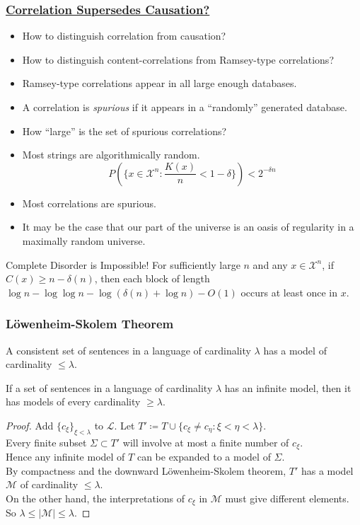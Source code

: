 \documentclass[UTF8,11pt,colorlinks,compress,openany]{beamer}%
\begin{document}
\begin{frame}\frametitle{\href{https://www.cs.auckland.ac.nz/~cristian/crispapers/fos2016.pdf}{Correlation Supersedes Causation?}}\vspace{-1ex}
	\begin{itemize}
		\item How to distinguish correlation from causation?
		\item How to distinguish content-correlations from Ramsey-type correlations?
		\item Ramsey-type correlations appear in all
		large enough databases.
		\item A correlation is \emph{spurious} if it appears in a ``randomly'' generated database.
		\item How ``large'' is the set of spurious correlations?
		\item Most strings are algorithmically random. 
		\[P\left(\Big\{x\in\mathcal{X}^n: \frac{K(x)}{n}<1-\delta\Big\}\right)<2^{-\delta n}\]
		\item Most correlations are spurious.
		\item It may be the case that our part of the universe is an oasis of regularity in a maximally random universe.
	\end{itemize}\vspace{-1ex}
	\begin{block}{Complete Disorder is Impossible!}
		For sufficiently large $n$ and any $x\in\mathcal{X}^n$, if $C(x)\geq n-\delta(n)$, then each block of length $\log n-\log\log n-\log(\delta(n)+\log n)-O(1)$ occurs at least once in $x$.
	\end{block}
\end{frame}

\begin{frame}\frametitle{L\"owenheim-Skolem Theorem}
\begin{theorem}
	A consistent set of sentences in a language of cardinality $\lambda$ has a model of cardinality $\leq\lambda$.
\end{theorem}
\begin{theorem}
	If a set of sentences in a language of cardinality $\lambda$ has an infinite model, then it has models of every cardinality $\geq\lambda$.
\end{theorem}
\begin{proof}
	Add $\{c_\xi\}_{\xi<\lambda}$ to $\mathscr{L}$. Let $T'\coloneqq T\cup\{c_\xi\ne c_\eta:\xi <\eta<\lambda\}$.\\
	Every finite subset $\Sigma\subset T'$ will involve at most a finite number of $c_\xi$.\\
	Hence any infinite model of $T$ can be expanded to a model of $\Sigma$.\\
	By compactness and the downward L\"owenheim-Skolem theorem, $T'$ has a model $\mathcal{M}$ of cardinality $\leq\lambda$.\\
	On the other hand, the interpretations of $c_\xi$ in $\mathcal{M}$ must give different elements. So $\lambda\leq |\mathcal{M}|\leq\lambda$.
\end{proof}
\end{frame}
\end{document}
